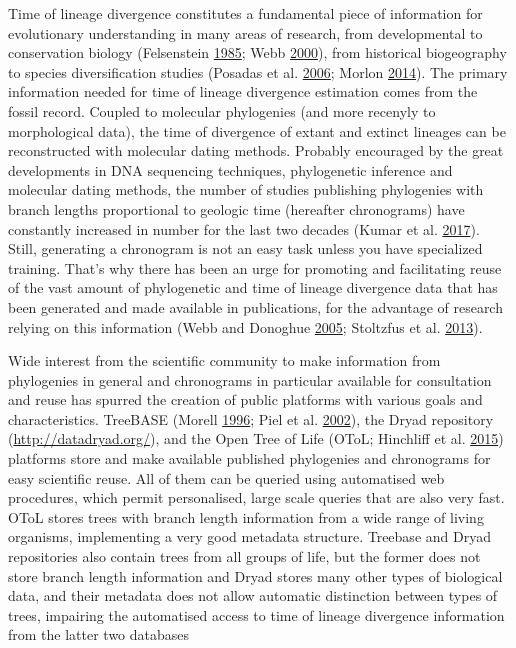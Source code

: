 \documentclass[]{article}
\begin{document}
Time of lineage divergence constitutes a fundamental piece of information for evolutionary
understanding in many areas of research, from developmental to conservation biology (Felsenstein \protect\hyperlink{ref-Felsenstein1985a}{1985}; Webb \protect\hyperlink{ref-Webb2000}{2000}), from historical biogeography to species diversification studies (Posadas et al. \protect\hyperlink{ref-posadas2006historical}{2006}; Morlon \protect\hyperlink{ref-Morlon2014}{2014}). The primary information needed for time of lineage divergence estimation comes from the fossil record. Coupled to molecular phylogenies (and more recenyly to morphological data), the time of divergence of extant and extinct lineages can be reconstructed with molecular dating methods.
Probably encouraged by the great developments in DNA sequencing techniques, phylogenetic inference and molecular dating methods, the number of studies publishing phylogenies with branch lengths proportional to geologic time (hereafter chronograms) have constantly increased in number for the last two decades (Kumar et al. \protect\hyperlink{ref-Kumar2017}{2017}).
Still, generating a chronogram is not an easy task unless you have specialized training. That's why there has been an urge for promoting and facilitating reuse of the vast amount of phylogenetic and time of lineage divergence data that has been generated and made available in publications, for the advantage of research relying on this information (Webb and Donoghue \protect\hyperlink{ref-webb2005phylomatic}{2005}; Stoltzfus et al. \protect\hyperlink{ref-Stoltzfus2013}{2013}).

Wide interest from the scientific community to make information from phylogenies in general and chronograms in particular available for consultation and reuse has spurred the creation of public platforms with various goals and characteristics. TreeBASE (Morell \protect\hyperlink{ref-morell1996roots}{1996}; Piel et al. \protect\hyperlink{ref-Piel2002}{2002}), the Dryad repository (\url{http://datadryad.org/}), and the Open Tree of Life (OToL; Hinchliff et al. \protect\hyperlink{ref-Hinchliff2015}{2015}) platforms store and make available published phylogenies and chronograms for easy scientific reuse. All of them can be queried using automatised web procedures, which permit personalised, large scale queries that are also very fast.
OToL stores trees with branch length information from a wide range of living organisms, implementing a very good metadata structure. Treebase and Dryad repositories also contain trees from all groups of life, but the former does not store branch length information and Dryad stores many other types of biological data, and their metadata does not allow automatic distinction between types of trees, impairing the automatised access to time of lineage divergence information from the latter two databases
\end{document}

